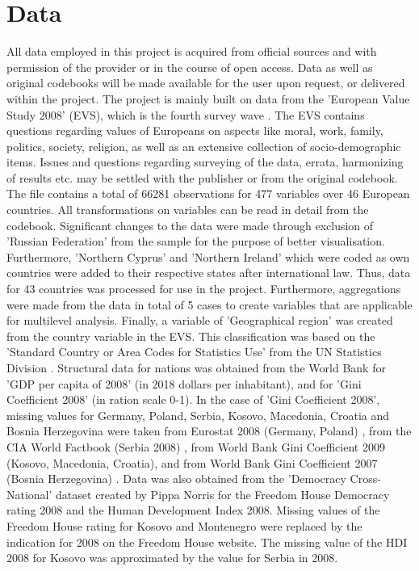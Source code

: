 \documentclass[preprint,12pt,authoryear]{elsarticle}
\begin{document}
\section{Data}
All data employed in this project is acquired from official sources and with permission of the provider or in the course of open access. Data as well as original codebooks will be made available for the user upon request, or delivered within the project.
The project is mainly built on data from the 'European Value Study 2008' (EVS), which is the fourth survey wave \citep{evs_european_2016}. The EVS contains questions regarding values of Europeans on aspects like moral, work, family, politics, society, religion, as well as an extensive collection of socio-demographic items. Issues and questions regarding surveying of the data, errata, harmonizing of results etc. may be settled with the publisher or from the original codebook. The file contains a total of 66281 observations for 477 variables over 46 European countries. All transformations on variables can be read in detail from the codebook. Significant changes to the data were made through exclusion of 'Russian Federation' from the sample for the purpose of better visualisation. Furthermore, 'Northern Cyprus' and 'Northern Ireland' which were coded as own countries were added to their respective states after international law. Thus, data for 43 countries was processed for use in the project. Furthermore, aggregations were made from the data in total of 5 cases to create variables that are applicable for multilevel analysis. Finally, a variable of 'Geographical region' was created from the country variable in the EVS. This classification was based on the 'Standard Country or Area Codes for Statistics Use' from the UN Statistics Division \citep{unsd_standard_2019}.
Structural data for nations was obtained from the World Bank for 'GDP per capita of 2008' (in 2018 dollars per inhabitant)\citep{world_bank_gdp_2019}, and for 'Gini Coefficient 2008' (in ration scale 0-1)\citep{world_bank_gini_2019}. In the case of 'Gini Coefficient 2008', missing values for Germany, Poland, Serbia, Kosovo, Macedonia, Croatia and Bosnia Herzegovina were taken from Eurostat 2008 (Germany, Poland) \citep{eurostat_eurostat_2019}, from the CIA World Factbook (Serbia 2008) \citep{central_intelligence_agency_serbia_2019}, from World Bank Gini Coefficient 2009 (Kosovo, Macedonia, Croatia), and from World Bank Gini Coefficient 2007 (Bosnia Herzegovina) \citep{world_bank_gini_2019}. Data was also obtained from the 'Democracy Cross-National' dataset created by Pippa Norris \citep{norris_data_2015} for the Freedom House Democracy rating 2008 and the Human Development Index 2008. Missing values of the Freedom House rating for Kosovo \citep{freedom_house_kosovo_2012} and Montenegro \citep{freedom_house_montenegro_2012} were replaced by the indication for 2008 on the Freedom House website. The missing value of the HDI 2008 for Kosovo was approximated by the value for Serbia in 2008. \\
\end{document}
